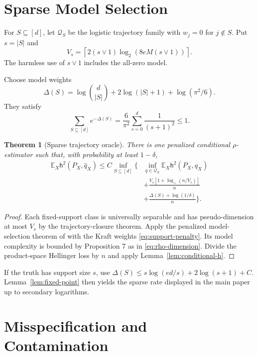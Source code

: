 \documentclass[twoside]{article}
\newtheorem{theorem}{Theorem}
\newcommand{\E}{\mathbb E}
\newcommand{\Q}{\mathcal Q}
\newcommand{\h}{\mathsf h}
\begin{document}
\section{Sparse Model Selection}
\label{app:sparse}

For $S\subseteq[d]$, let $\Q_S$ be the logistic trajectory family with $w_j=0$ for $j\notin S$. Put $s=|S|$ and
\[
 V_s=\left\lceil2(s\vee1)\log_2(8eM(s\vee1))\right\rceil.
\]
The harmless use of $s\vee1$ includes the all-zero model.

Choose model weights
\begin{equation}
 \Delta(S)=\log\binom d{|S|}+2\log(|S|+1)+\log(\pi^2/6).
 \label{eq:support-penalty}
\end{equation}
They satisfy
\[
 \sum_{S\subseteq[d]}e^{-\Delta(S)}
 =\frac6{\pi^2}\sum_{s=0}^d\frac1{(s+1)^2}\leq1.
\]

\begin{theorem}[Sparse trajectory oracle]
\label{thm:sparse-full}
There is one penalized conditional $\rho$-estimator such that, with probability at least $1-\delta$,
\begin{align*}
 \E_X\h^2(P_X,\widehat q_X)
 \leq C\inf_{S\subseteq[d]}\bigg\{&\inf_{q\in\Q_S}\E_X\h^2(P_X,q_X)\\
 &+\frac{V_s[1+\log_+(n/V_s)]}{n}\\
 &+\frac{\Delta(S)+\log(1/\delta)}{n}\bigg\}.
\end{align*}
\end{theorem}

\begin{proof}
Each fixed-support class is universally separable and has pseudo-dimension at most $V_s$ by the trajectory-closure theorem. Apply the penalized model-selection theorem of \citet[Theorem 2]{baraud2018} with the Kraft weights \eqref{eq:support-penalty}. Its model complexity is bounded by Proposition 7 as in \eqref{eq:rho-dimension}. Divide the product-space Hellinger loss by $n$ and apply Lemma~\ref{lem:conditional-h}.
\end{proof}

If the truth has support size $s$, use $\Delta(S)\leq s\log(ed/s)+2\log(s+1)+C$. Lemma~\ref{lem:fixed-point} then yields the sparse rate displayed in the main paper up to secondary logarithms.

\section{Misspecification and Contamination}
\label{app:robustness}
\end{document}

